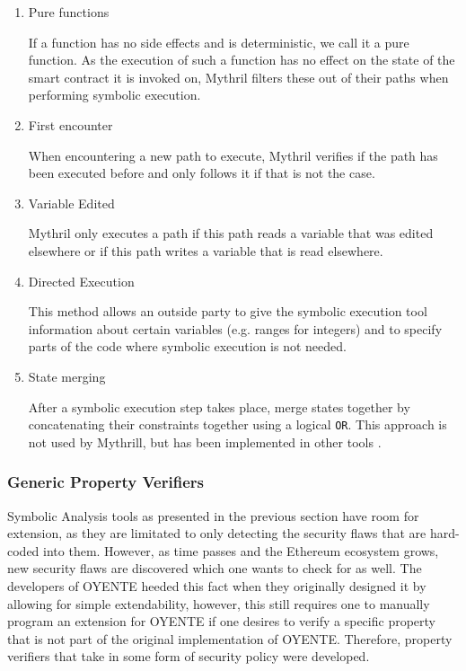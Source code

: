 \documentclass[letterpaper,twocolumn,10pt]{article}
\begin{document}
\begin{enumerate}
	\item Pure functions 
	
	If a function has no side effects and is deterministic, we call it a pure function. As the execution of such a function has no effect on the state of the smart contract it is invoked on, Mythril filters these out of their paths when performing symbolic execution.
	
	\item First encounter
	
	
	When encountering a new path to execute, Mythril verifies if the path has been executed before and only follows it if that is not the case.
	
	\item Variable Edited

	Mythril only executes a path if this path reads a variable that was edited elsewhere or if this path writes a variable that is read elsewhere.
	
	\item Directed Execution
	
	This method allows an outside party to give the symbolic execution tool information about certain variables (e.g. ranges for integers) and to specify parts of the code where symbolic execution is not needed.	
	
	\item State merging
	
	After a symbolic execution step takes place, merge states together by concatenating their constraints together using a logical \verb|OR|. This approach is not used by Mythrill, but has been implemented in other tools \cite{mossberg_manzano_hennenfent_groce_grieco_feist_brunson_dinaburg_2019}.
	
	
\end{enumerate}

\subsubsection{Generic Property Verifiers}
Symbolic Analysis tools as presented in the previous section have room for extension, as they are  limitated to only detecting the security flaws that are hard-coded into them. However, as time passes and the Ethereum ecosystem grows, new security flaws are discovered which one wants to check for as well. The developers of OYENTE heeded this fact when they originally designed it by allowing for simple extendability, however, this still requires one to manually program an extension for OYENTE if one desires to verify a specific property that is not part of the original implementation of OYENTE. Therefore, property verifiers that take in some form of security policy were developed. 
\end{document}
